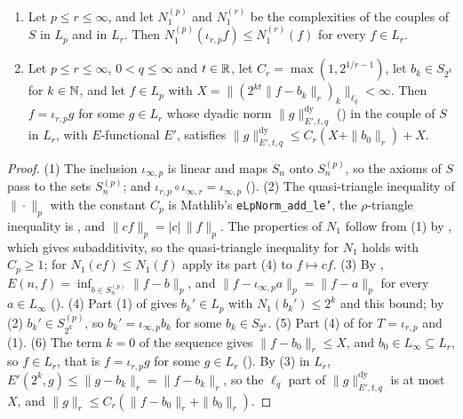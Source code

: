 \begin{lemma}
\begin{enumerate}
  \item Let $p \leq r \leq \infty$, and let $N_1^{(p)}$ and $N_1^{(r)}$ be the complexities of the
    couples of $S$ in $L_p$ and in $L_r$. Then $N_1^{(p)}(\iota_{r,p} f) \leq N_1^{(r)}(f)$ for
    every $f \in L_r$.
  \item Let $p \leq r \leq \infty$, $0 < q \leq \infty$ and $t \in \mathbb{R}$, let
    $C_r = \max(1, 2^{1/r - 1})$, let $b_k \in S_{2^k}$ for $k \in \mathbb{N}$, and let $f \in L_p$
    with $X = \|(2^{kt} \|f - b_k\|_r)_k\|_{\ell_q} < \infty$. Then $f = \iota_{r,p} g$ for some
    $g \in L_r$ whose dyadic norm $\|g\|^{\mathrm{dy}}_{E', t, q}$ () in the
    couple of $S$ in $L_r$, with $E$-functional $E'$, satisfies
    $\|g\|^{\mathrm{dy}}_{E', t, q} \leq C_r (X + \|b_0\|_r) + X$.
\end{enumerate}
\end{lemma}

\begin{proof}
\leanok
{}
(1) The inclusion $\iota_{\infty,p}$ is linear and maps $S_n$ onto $S^{(p)}_n$, so the axioms of
$S$ pass to the sets $S^{(p)}_n$; and $\iota_{r,p} \circ \iota_{\infty,r} = \iota_{\infty,p}$
(). (2) The quasi-triangle inequality of $\|\cdot\|_p$ with the
constant $C_p$ is Mathlib's \texttt{eLpNorm\_\allowbreak add\_\allowbreak le'}, the
$\rho$-triangle inequality is , and $\|cf\|_p = |c| \, \|f\|_p$. The
properties of $N_1$ follow from (1) by , which gives subadditivity,
so the quasi-triangle inequality for $N_1$ holds with $C_p \geq 1$; for $N_1(cf) \leq N_1(f)$
apply its part (4) to $f \mapsto cf$. (3) By ,
$E(n, f) = \inf_{b \in S^{(p)}_n} \|f - b\|_p$, and
$\|f - \iota_{\infty,p} a\|_p = \|f - a\|_p$ for every $a \in L_\infty$
().
(4) Part (1) of  gives $b_k' \in L_p$ with $N_1(b_k') \leq 2^k$ and this
bound; by (2) $b_k' \in S^{(p)}_{2^k}$, so $b_k' = \iota_{\infty,p} b_k$ for some
$b_k \in S_{2^k}$. (5) Part (4) of  for $T = \iota_{r,p}$ and (1).
(6) The term $k = 0$ of the sequence gives $\|f - b_0\|_r \leq X$, and
$b_0 \in L_\infty \subseteq L_r$, so $f \in L_r$, that is $f = \iota_{r,p} g$ for some
$g \in L_r$ (). By (3) in $L_r$,
$E'(2^k, g) \leq \|g - b_k\|_r = \|f - b_k\|_r$, so the $\ell_q$ part of
$\|g\|^{\mathrm{dy}}_{E', t, q}$ is at most $X$, and
$\|g\|_r \leq C_r (\|f - b_0\|_r + \|b_0\|_r)$.
\end{proof}

